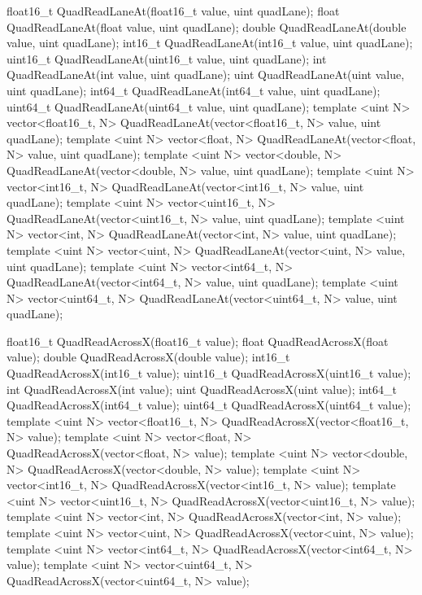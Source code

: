 \begin{HLSL}
float16_t QuadReadLaneAt(float16_t value, uint quadLane);
float QuadReadLaneAt(float value, uint quadLane);
double QuadReadLaneAt(double value, uint quadLane);
int16_t QuadReadLaneAt(int16_t value, uint quadLane);
uint16_t QuadReadLaneAt(uint16_t value, uint quadLane);
int QuadReadLaneAt(int value, uint quadLane);
uint QuadReadLaneAt(uint value, uint quadLane);
int64_t QuadReadLaneAt(int64_t value, uint quadLane);
uint64_t QuadReadLaneAt(uint64_t value, uint quadLane);
template <uint N>
vector<float16_t, N> QuadReadLaneAt(vector<float16_t, N> value, uint quadLane);
template <uint N>
vector<float, N> QuadReadLaneAt(vector<float, N> value, uint quadLane);
template <uint N>
vector<double, N> QuadReadLaneAt(vector<double, N> value, uint quadLane);
template <uint N>
vector<int16_t, N> QuadReadLaneAt(vector<int16_t, N> value, uint quadLane);
template <uint N>
vector<uint16_t, N> QuadReadLaneAt(vector<uint16_t, N> value, uint quadLane);
template <uint N>
vector<int, N> QuadReadLaneAt(vector<int, N> value, uint quadLane);
template <uint N>
vector<uint, N> QuadReadLaneAt(vector<uint, N> value, uint quadLane);
template <uint N>
vector<int64_t, N> QuadReadLaneAt(vector<int64_t, N> value, uint quadLane);
template <uint N>
vector<uint64_t, N> QuadReadLaneAt(vector<uint64_t, N> value, uint quadLane);

float16_t QuadReadAcrossX(float16_t value);
float QuadReadAcrossX(float value);
double QuadReadAcrossX(double value);
int16_t QuadReadAcrossX(int16_t value);
uint16_t QuadReadAcrossX(uint16_t value);
int QuadReadAcrossX(int value);
uint QuadReadAcrossX(uint value);
int64_t QuadReadAcrossX(int64_t value);
uint64_t QuadReadAcrossX(uint64_t value);
template <uint N> vector<float16_t, N> QuadReadAcrossX(vector<float16_t, N> value);
template <uint N> vector<float, N> QuadReadAcrossX(vector<float, N> value);
template <uint N> vector<double, N> QuadReadAcrossX(vector<double, N> value);
template <uint N> vector<int16_t, N> QuadReadAcrossX(vector<int16_t, N> value);
template <uint N> vector<uint16_t, N> QuadReadAcrossX(vector<uint16_t, N> value);
template <uint N> vector<int, N> QuadReadAcrossX(vector<int, N> value);
template <uint N> vector<uint, N> QuadReadAcrossX(vector<uint, N> value);
template <uint N> vector<int64_t, N> QuadReadAcrossX(vector<int64_t, N> value);
template <uint N> vector<uint64_t, N> QuadReadAcrossX(vector<uint64_t, N> value);


\end{HLSL}
